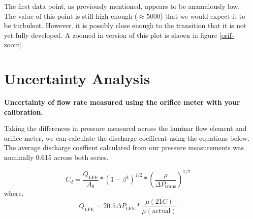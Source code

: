 \documentclass{article}
\begin{document}
The first data point, as previously mentioned, appears to be anamalously low. The value of this point is 
still high enough ($\approx 5000$) that we would expect it to be turbulent. However, it is possibly close enough 
to the transition that it is not yet fully developed. A zoomed in version of this plot is shown in figure \ref{orif-zoom}. 

\newpage
\section{Uncertainty Analysis}

\textbf{Uncertainty of flow rate measured using the orifice meter with
your calibration.} 

Taking the differences in pressure measured across the laminar flow element and orifice meter, 
we can calculate the discharge coefficent using the equations below. The average discharge coeffient 
calculated from our pressure measurements was nominally 0.615 across both series.

\begin{equation}
  C_d = \frac{Q_{\text{LFE}} }{A_0} * (1-\beta^4)^{1/2} * \left(\frac{\rho}{\Delta P_{\text{trans}}}\right)^{1/2}
\end{equation}
where, 
\begin{equation}
  Q_{\text{LFE}} = 20.5 \Delta P_{\text{LFE}} * \frac{\mu(21 C)}{\mu(\text{actual})}
\end{equation}
\end{document}
